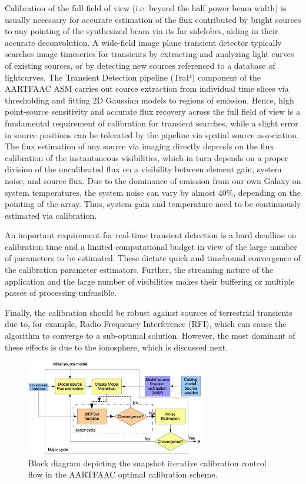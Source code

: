 \documentclass[referee]{aa}
\begin{document}
Calibration of the  full field of view (i.e. beyond the  half power beam width)
is usually necessary  for accurate estimation of the  flux contributed by bright
sources to any pointing of the synthesized beam via its far sidelobes, aiding in
their  accurate  deconvolution.  A  wide-field  image  plane transient  detector
typically searches  image timeseries for transients by  extracting and analyzing
light curves  of existing sources, or  by detecting new sources  referenced to a
database   of   lightcurves.     The   Transient   Detection   pipeline   (TraP)
\citep{swinbank2014trap}  component  of  the  AARTFAAC ASM  carries  out  source
extraction  from individual  time slices via  thresholding and  fitting \mbox{2D}
Gaussian models  to regions of  emission.  Hence, high  point-source sensitivity
and  accurate flux  recovery across  the  full field  of view  is a  fundamental
requirement  of calibration  for transient  searches,  while a  slight error  in
source  positions  can   be  tolerated  by  the  pipeline   via  spatial  source
association.  The flux estimation of  any source via imaging directly depends on
the flux calibration of the instantaneous visibilities, which in turn depends on
a proper division of the uncalibrated flux on a visibility between element gain,
system noise,  and source flux.   Due to the  dominance of emission from  our own
Galaxy  on system  temperatures, the  system noise  can vary  by  almost $40\%$,
depending on the pointing of the  array.  Thus, system gain and temperature need
to be continuously estimated via calibration.

An important requirement for real-time transient detection is a hard deadline on
calibration time and a limited computational budget in view of the large number
of parameters to be estimated.  These dictate quick and timebound convergence of
the  calibration parameter  estimators.  Further,  the streaming  nature  of the
application  and the  large  number  of visibilities  makes  their buffering  or
multiple passes of processing unfeasible.

Finally,  the  calibration  should  be  robust against  sources  of  terrestrial
transients due  to, for example,  Radio Frequency Interference (RFI),  which can
cause the  algorithm to converge to  a sub-optimal solution.   However, the most
dominant of these effects is due to the ionosphere, which is discussed next.

\begin{figure}[tbh]
\centering
\includegraphics[width=0.7\textwidth]{Figs/Fig2_blkdiag.png}
\caption{Block diagram depicting the snapshot
iterative calibration control flow in the AARTFAAC optimal calibration
scheme. }
\label{fig:Block-diagram-depicting}
\end{figure}
\end{document}
